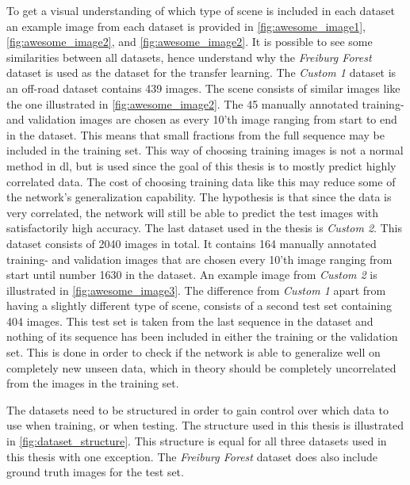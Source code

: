 \documentclass[USenglish]{ifimaster}  %
\begin{document}
To get a visual understanding of which type of scene is included in each dataset an example image from each dataset is provided in \cref{fig:awesome_image1}, \cref{fig:awesome_image2}, and \cref{fig:awesome_image2}. It is possible to see some similarities between all datasets, hence understand why the \textit{Freiburg Forest} dataset is used as the dataset for the transfer learning. The \textit{Custom 1} dataset is an off-road dataset contains 439 images. The scene consists of similar images like the one illustrated in \cref{fig:awesome_image2}. The 45 manually annotated training- and validation images are chosen as every 10'th image ranging from start to end in the dataset. This means that small fractions from the full sequence may be included in the training set. This way of choosing training images is not a normal method in \ac{dl}, but is used since the goal of this thesis is to mostly predict highly correlated data. The cost of choosing training data like this may reduce some of the network's generalization capability. The hypothesis is that since the data is very correlated, the network will still be able to predict the test images with satisfactorily high accuracy. 
\newline
\newline
The last dataset used in the thesis is \textit{Custom 2}. This dataset consists of 2040 images in total. It contains 164 manually annotated training- and validation images that are chosen every 10'th image ranging from start until number 1630 in the dataset. An example image from \textit{Custom 2} is illustrated in \cref{fig:awesome_image3}. The difference from \textit{Custom 1} apart from having a slightly different type of scene, consists of a second test set containing 404 images. This test set is taken from the last sequence in the dataset and nothing of its sequence has been included in either the training or the validation set. This is done in order to check if the network is able to generalize well on completely new unseen data, which in theory should be completely uncorrelated from the images in the training set.

The datasets need to be structured in order to gain control over which data to use when training, or when testing. The structure used in this thesis is illustrated in \cref{fig:dataset_structure}. This structure is equal for all three datasets used in this thesis with one exception. The \textit{Freiburg Forest} dataset does also include ground truth images for the test set.
\end{document}
